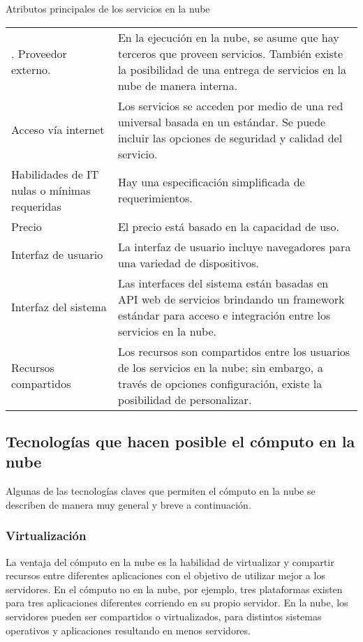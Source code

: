 \begin{savenotes}\sphinxattablestart
\centering
{}
\caption{Atributos principales de los servicios en la nube \label{\detokenize{chapter_one/cloud_computing:key-cloud-services-attr}}}
\sphinxaftercaption
\begin{tabulary}{\linewidth}[t]{|T|T|}
\hline
{}\relax &\relax \\
\hline
{}. Proveedor externo.
&
En la ejecución en la nube, se asume que hay terceros que proveen servicios. También existe la posibilidad de una entrega de servicios en la nube de manera interna.
\\
\hline
Acceso vía internet
&
Los servicios se acceden por medio de una red universal basada en un estándar. Se puede incluir las opciones de seguridad y calidad del servicio.
\\
\hline
Habilidades de IT nulas o mínimas requeridas
&
Hay una especificación simplificada de requerimientos.
\\
\hline
Precio
&
El precio está basado en la capacidad de uso.
\\
\hline
Interfaz de usuario
&
La interfaz de usuario incluye navegadores para una variedad de dispositivos.
\\
\hline
Interfaz del sistema
&
Las interfaces del sistema están basadas en API web de servicios brindando un framework estándar para acceso e integración entre los servicios en la nube.
\\
\hline
Recursos compartidos
&
Los recursos son compartidos entre los usuarios de los servicios en la nube; sin embargo, a través de opciones configuración, existe la posibilidad de personalizar.
\\
\hline
\end{tabulary}
\par
\sphinxattableend\end{savenotes}


\subsection{Tecnologías que hacen posible el cómputo en la nube}
\label{\detokenize{chapter_one/cloud_computing:tecnologias-que-hacen-posible-el-computo-en-la-nube}}
Algunas de las tecnologías claves que permiten el cómputo en la nube se describen
de manera muy general y breve a continuación.


\subsubsection{Virtualización}
\label{\detokenize{chapter_one/cloud_computing:virtualizacion}}
La ventaja del cómputo en la nube es la habilidad de virtualizar y compartir
recursos entre diferentes aplicaciones con el objetivo de utilizar mejor a los
servidores. En el cómputo no en la nube, por ejemplo, tres plataformas existen para
tres aplicaciones diferentes corriendo en su propio servidor. En la nube,
los servidores pueden ser compartidos o virtualizados, para distintos sistemas
operativos y aplicaciones resultando en menos servidores.

